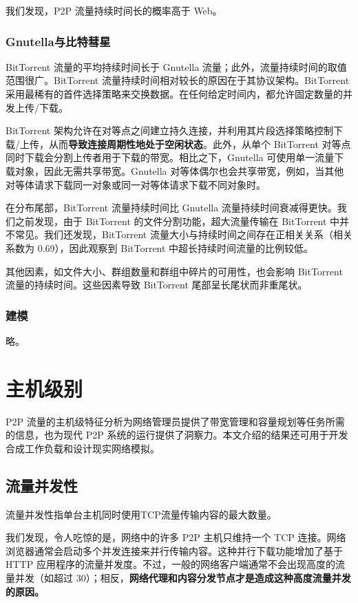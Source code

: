 我们发现，P2P 流量持续时间长的概率高于 Web。

\subsubsection{Gnutella与比特彗星}

BitTorrent 流量的平均持续时间长于 Gnutella 流量；此外，流量持续时间的取值范围很广。BitTorrent 流量持续时间相对较长的原因在于其协议架构。BitTorrent 采用最稀有的首件选择策略来交换数据。在任何给定时间内，都允许固定数量的并发上传/下载。

BitTorrent 架构允许在对等点之间建立持久连接，并利用其片段选择策略控制下载/上传，从而\textbf{导致连接周期性地处于空闲状态}。此外，从单个 BitTorrent 对等点同时下载会分割上传者用于下载的带宽。相比之下，Gnutella 可使用单一流量下载对象，因此无需共享带宽。Gnutella 对等体偶尔也会共享带宽，例如，当其他对等体请求下载同一对象或同一对等体请求下载不同对象时。

在分布尾部，BitTorrent 流量持续时间比 Gnutella 流量持续时间衰减得更快。我们之前发现，由于 BitTorrent 的文件分割功能，超大流量传输在 BitTorrent 中并不常见。我们还发现，BitTorrent 流量大小与持续时间之间存在正相关关系（相关系数为 0.69），因此观察到 BitTorrent 中超长持续时间流量的比例较低。

其他因素，如文件大小、群组数量和群组中碎片的可用性，也会影响 BitTorrent 流量的持续时间。这些因素导致 BitTorrent 尾部呈长尾状而非重尾状。

\subsubsection{建模}

略。

\section{主机级别}

P2P 流量的主机级特征分析为网络管理员提供了带宽管理和容量规划等任务所需的信息，也为现代 P2P 系统的运行提供了洞察力。本文介绍的结果还可用于开发合成工作负载和设计现实网络模拟。

\subsection{流量并发性}

流量并发性指单台主机同时使用TCP流量传输内容的最大数量。

我们发现，令人吃惊的是，网络中的许多 P2P 主机只维持一个 TCP 连接。网络浏览器通常会启动多个并发连接来并行传输内容。这种并行下载功能增加了基于 HTTP 应用程序的流量并发度。不过，一般的网络客户端通常不会出现高度的流量并发（如超过 30）；相反，\textbf{网络代理和内容分发节点才是造成这种高度流量并发的原因。}

